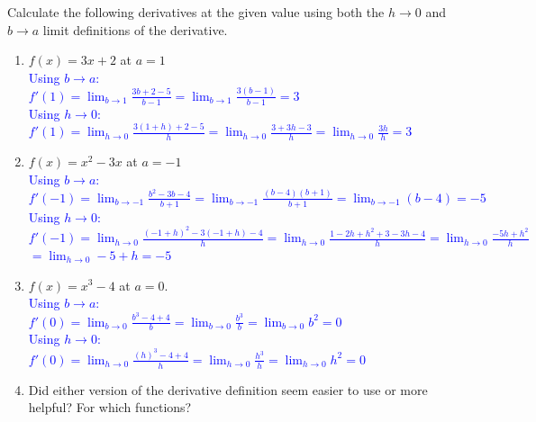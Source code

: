 \documentclass{ximera}
\begin{document}
\begin{exercise}
Calculate the following derivatives at the given value using both the $h\rightarrow 0$ and $b\rightarrow a$ limit definitions of the derivative.\\
    \begin{enumerate}
        \item $f(x)=3x+2$ at $a=1$\\
        \textcolor{blue}{Using $b\rightarrow a$:\\
        $\displaystyle f'(1)=\lim_{b\rightarrow 1}\frac{3b+2-5}{b-1}=\lim_{b\rightarrow 1}\frac{3(b-1)}{b-1}=3$\\
        Using $h\rightarrow 0$:\\
        $\displaystyle f'(1)=\lim_{h\rightarrow 0}\frac{3(1+h)+2-5}{h}=\lim_{h\rightarrow 0}\frac{3+3h-3}{h}=\lim_{h\rightarrow 0}\frac{3h}{h}=3$}
        
        \item $f(x)=x^2-3x$ at $a=-1$\\
        \textcolor{blue}{ Using $b\rightarrow a$:\\
        $\displaystyle f'(-1)=\lim_{b\rightarrow -1}\frac{b^2-3b-4}{b+1}=\lim_{b\rightarrow -1}\frac{(b-4)(b+1)}{b+1}=\lim_{b\rightarrow -1}(b-4)=-5$\\
        Using $h\rightarrow 0$:\\
        $\displaystyle f'(-1)=\lim_{h\rightarrow 0}\frac{(-1+h)^2-3(-1+h)-4}{h}=\lim_{h\rightarrow 0}\frac{1-2h+h^2+3-3h-4}{h}=\lim_{h\rightarrow 0}\frac{-5h+h^2}{h}$\\
        $=\lim_{h\rightarrow 0}-5+h=-5$}
        
        \item $f(x)=x^3-4$ at $a=0$.\\
        \textcolor{blue}{Using $b\rightarrow a$:\\
        $\displaystyle f'(0)=\lim_{b\rightarrow 0}\frac{b^3-4+4}{b}=\lim_{b\rightarrow 0}\frac{b^3}{b}=\lim_{b\rightarrow 0}b^2=0$\\
        Using $h\rightarrow 0$:\\
        $\displaystyle f'(0)=\lim_{h\rightarrow 0}\frac{(h)^3-4+4}{h}=\lim_{h\rightarrow 0}\frac{h^3}{h}=\lim_{h\rightarrow 0}h^2=0$}
        
        \item Did either version of the derivative definition seem easier to use or more helpful?  For which functions? 
    \end{enumerate}

    \end{exercise}
\end{document}
